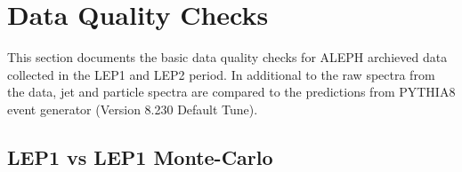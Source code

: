 \section{Data Quality Checks}

This section documents the basic data quality checks for ALEPH archieved data collected in the LEP1 and LEP2 period. In additional to the raw spectra from the data, jet and particle spectra are compared to the predictions from PYTHIA8 event generator (Version 8.230 Default Tune). 

\subsection{LEP1 vs LEP1 Monte-Carlo}
\begin{figure}[H]
\centering
{}\hfill
{}\hfill
{}\hfill
\caption{}  
\end{figure}

